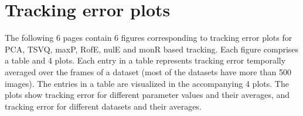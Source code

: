 \clearpage
\newpage
\section{Tracking error plots}
\label{App:tracking_error_plots}
The following 6 pages contain 6 figures corresponding to tracking error plots for PCA, TSVQ, maxP, RofE, nulE and monR based tracking.  Each figure comprises a table and 4 plots.  Each entry in a table represents tracking error temporally averaged over the frames of a dataset (most of the datasets have more than 500 images).  The entries in a table are visualized in the accompanying 4 plots.  The plots show tracking error for different parameter values and their averages, and tracking error for different datasets and their averages. 

\clearpage
\newpage
